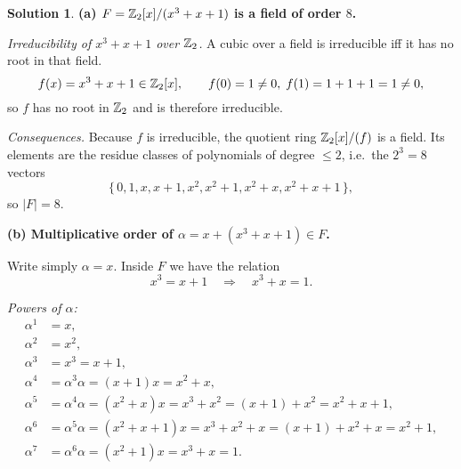 \documentclass[12pt]{article}
\theoremstyle{definition} %
\newtheorem{solution}{Solution}
\theoremstyle{plain} %
\begin{document}
                  \begin{solution}
                    \textbf{(a)  \(F=\Bbb Z_{2}[x]/(x^{3}+x+1)\) is a field of order \(8\).}
                    
                    \medskip
                    \emph{Irreducibility of \(x^{3}+x+1\) over \(\Bbb Z_{2}\).}  
                    A cubic over a field is irreducible iff it has no root in that field.
                    \[
                    f(x)=x^{3}+x+1\in\Bbb Z_{2}[x], 
                    \qquad
                    f(0)=1\neq0,\; f(1)=1+1+1=1\neq0,
                    \]
                    so \(f\) has no root in \(\Bbb Z_{2}\) and is therefore irreducible.
                    
                    \medskip
                    \emph{Consequences.}  
                    Because \(f\) is irreducible, the quotient ring
                    \(\Bbb Z_{2}[x]/(f)\) is a field.  
                    Its elements are the residue classes of polynomials of degree
                    \(\le2\), i.e.\ the \(2^{3}=8\) vectors
                    \[
                    \{\,0,1,x,x+1,x^{2},x^{2}+1,x^{2}+x,x^{2}+x+1\,\},
                    \]
                    so \(\lvert F\rvert = 8\).
                    
                    \bigskip
                    \textbf{(b)  Multiplicative order of \(\alpha=x+(x^{3}+x+1)\in F\).}
                    
                    Write simply \(\alpha=x\).  
                    Inside \(F\) we have the relation
                    \[
                       x^{3} = x+1
                       \quad\Longrightarrow\quad
                       x^{3}+x = 1.
                    \]
                    
                    \smallskip
                    \emph{Powers of \(\alpha\):}
                    \[
                    \begin{aligned}
                    \alpha^{1} &= x,\\
                    \alpha^{2} &= x^{2},\\
                    \alpha^{3} &= x^{3}=x+1,\\
                    \alpha^{4} &= \alpha^{3}\alpha = (x+1)x = x^{2}+x,\\
                    \alpha^{5} &= \alpha^{4}\alpha = (x^{2}+x)x = x^{3}+x^{2}= (x+1)+x^{2}=x^{2}+x+1,\\
                    \alpha^{6} &= \alpha^{5}\alpha = (x^{2}+x+1)x = x^{3}+x^{2}+x = (x+1)+x^{2}+x = x^{2}+1,\\
                    \alpha^{7} &= \alpha^{6}\alpha = (x^{2}+1)x = x^{3}+x = 1.
                    \end{aligned}
                    \]
                    

\end{solution}
\end{document}
